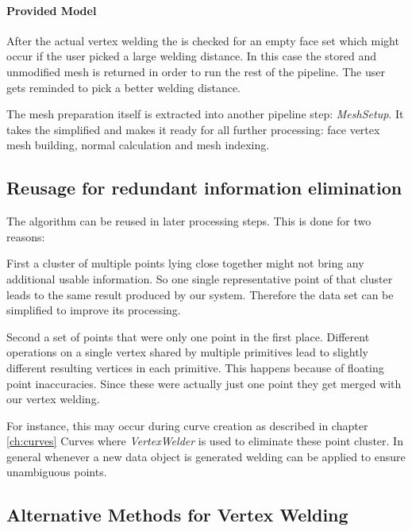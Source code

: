 \documentclass[../ClassicThesis.tex]{subfiles}
\begin{document}
\paragraph{Provided Model}

After the actual vertex welding the {\threedmodel} is checked for an empty face set which might occur if the user picked a large welding distance. In this case the stored and unmodified mesh is returned in order to run the rest of the pipeline. The user gets reminded to pick a better welding distance.

The mesh preparation itself is extracted into another pipeline step: \emph{MeshSetup}. It takes the simplified {\threedmodel} and makes it ready for all further processing: face vertex mesh building, normal calculation and mesh indexing.



\subsection{Reusage for redundant information elimination}

The algorithm can be reused in later processing steps. This is done for two reasons:

First a cluster of multiple points lying close together might not bring any additional usable information. So one single representative point of that cluster leads to the same result produced by our system. Therefore the data set can be simplified to improve its processing.

Second a set of points that were only one point in the first place. Different operations on a single vertex shared by multiple primitives lead to slightly different resulting vertices in each primitive. This happens because of floating point inaccuracies. Since these were actually just one point they get merged with our vertex welding.

For instance, this may occur during curve creation as described in chapter \ref{ch:curves} Curves where \emph{VertexWelder} is used to eliminate these point cluster. In general whenever a new data object is generated welding can be applied to ensure unambiguous points.





\subsection{Alternative Methods for Vertex Welding}
\end{document}
